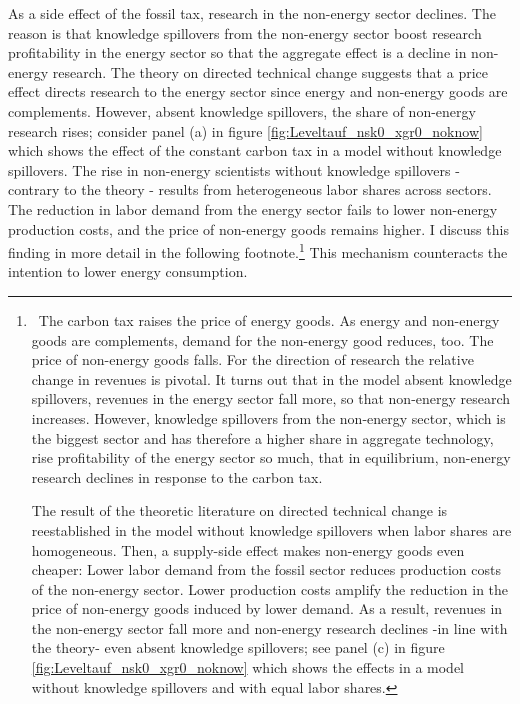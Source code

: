  As a side effect of the fossil tax, research in the non-energy sector declines. 
 The reason is that knowledge spillovers from the non-energy sector boost research profitability in the energy sector so that the aggregate effect is a decline in non-energy research. The theory on directed technical change suggests that a price effect directs research to the energy sector since energy and non-energy goods are complements.  However, absent knowledge spillovers, the share of non-energy research rises; consider panel (a) in figure \ref{fig:Leveltauf_nsk0_xgr0_noknow} which shows the effect of the constant carbon tax in a model without knowledge spillovers. The rise in non-energy scientists without knowledge spillovers - contrary to the theory - results from heterogeneous labor shares across sectors. The reduction in labor demand from the energy sector fails to lower non-energy production costs, and the price of non-energy goods remains higher. I discuss this finding in more detail in the following footnote.\footnote{\ The carbon tax raises the price of energy goods. As energy and non-energy goods are complements, demand for the non-energy good reduces, too. The price of non-energy goods falls. For the direction of research the relative change in revenues is pivotal. 
 It turns out that in the model absent knowledge spillovers, revenues in the energy sector fall more, so that non-energy research increases. However, knowledge spillovers from the non-energy sector, which is the biggest sector and has therefore a higher share in aggregate technology, rise profitability of the energy sector so much, that in equilibrium, non-energy research declines in response to the carbon tax. 
 
 The result of the theoretic literature \citep[e.g.][]{Hemous2021DirectedEconomics} on directed technical change is reestablished in the model without knowledge spillovers when labor shares are homogeneous. Then, a supply-side effect makes non-energy goods even cheaper: Lower labor demand from the fossil sector reduces production costs of the non-energy sector. Lower production costs amplify the reduction in the price of non-energy goods induced by lower demand.  As a result, revenues in the non-energy sector fall more and non-energy research declines -in line with the theory- even absent knowledge spillovers; see panel (c) in figure \ref{fig:Leveltauf_nsk0_xgr0_noknow} which shows the effects in a model without knowledge spillovers and with equal labor shares.  } 
 This mechanism counteracts the intention to lower energy consumption. %
 

